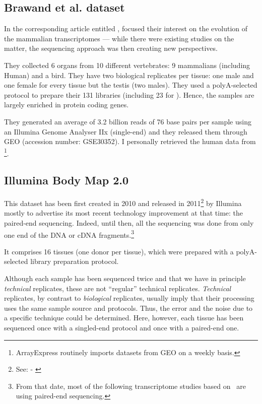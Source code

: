\subsection{Brawand et al. dataset}

In the corresponding article entitled ,
\citet{VTpaper} focused their interest on the
evolution of the mammalian transcriptomes --- while there were existing studies
on the matter, the sequencing approach was then creating new perspectives.

They collected 6 organs from 10 different vertebrates:
9 mammalians (including Human) and a bird. They have two biological replicates
per tissue: one male and one female for every tissue but the testis (two males).
They used a polyA-selected protocol to prepare their 131 libraries (including 23
for ).
Hence, the samples are largely enriched in protein coding genes.

They generated an average of 3.2 billion reads of 76 base pairs per sample
using an Illumina Genome Analyser IIx (single-end) and they released them
through \gls{GEO} (accession number: GSE30352).
I personally retrieved the human data from
\footnote{ArrayExpress routinely imports
datasets from \gls{GEO} on a weekly basis.}.


\subsection{Illumina Body Map 2.0}
This dataset has been first created in 2010 and released in
2011\footnote{See:  - \cite{ibmEnsembl}} by Illumina
mostly to advertise its most recent technology improvement at that time:
the paired-end sequencing. Indeed, until then, all the sequencing was done
from only one end of the \gls{DNA} or \gls{cDNA} fragments.\footnote{From that
date, most of the following transcriptome studies based on \Rnaseq\ are using
paired-end sequencing.}

It comprises 16 tissues (one donor per tissue), which were prepared with a
polyA-selected library preparation protocol.

Although each sample has been sequenced twice and that we have in principle
\emph{technical} replicates, these are not ``regular'' technical
replicates. \emph{Technical} replicates,
by contrast to \emph{biological} replicates,
usually imply that their processing uses the same sample source and protocols.
Thus, the error and the noise due to a specific technique could be determined.
Here, however, each tissue has been sequenced once with a singled-end protocol
and once with a paired-end one.

